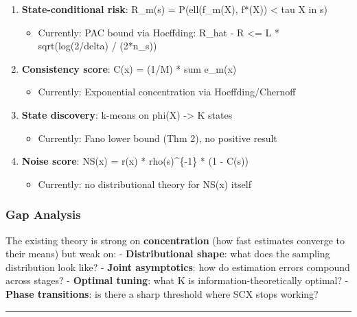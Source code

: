 \documentclass[
  12pt,
]{article}
\providecommand{\tightlist}{%
  \setlength{\itemsep}{0pt}\setlength{\parskip}{0pt}}
\begin{document}
\begin{enumerate}
\def\labelenumi{\arabic{enumi}.}
\tightlist
\item
  \textbf{State-conditional risk}: R\_m(s) = P(ell(f\_m(X), f*(X))
  \textless{} tau \textbar{} X in s)

  \begin{itemize}
  \tightlist
  \item
    Currently: PAC bound via Hoeffding: \textbar R\_hat - R\textbar{}
    \textless= L * sqrt(log(2/delta) / (2*n\_s))
  \end{itemize}
\item
  \textbf{Consistency score}: C(x) = (1/M) * sum e\_m(x)

  \begin{itemize}
  \tightlist
  \item
    Currently: Exponential concentration via Hoeffding/Chernoff
  \end{itemize}
\item
  \textbf{State discovery}: k-means on phi(X) -\textgreater{} K states

  \begin{itemize}
  \tightlist
  \item
    Currently: Fano lower bound (Thm 2), no positive result
  \end{itemize}
\item
  \textbf{Noise score}: NS(x) = r(x) * rho(s)\^{}\{-1\} * (1 - C(s))

  \begin{itemize}
  \tightlist
  \item
    Currently: no distributional theory for NS(x) itself
  \end{itemize}
\end{enumerate}

\subsubsection{Gap Analysis}\label{gap-analysis}

The existing theory is strong on \textbf{concentration} (how fast
estimates converge to their means) but weak on: - \textbf{Distributional
shape}: what does the sampling distribution look like? - \textbf{Joint
asymptotics}: how do estimation errors compound across stages? -
\textbf{Optimal tuning}: what K is information-theoretically optimal? -
\textbf{Phase transitions}: is there a sharp threshold where SCX stops
working?

\begin{center}\rule{0.5\linewidth}{0.5pt}\end{center}
\end{document}
